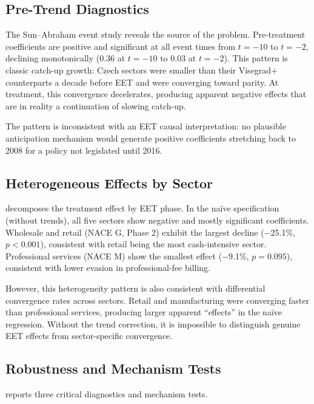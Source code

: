 \documentclass[12pt]{article}
\begin{document}
\subsection{Pre-Trend Diagnostics}

The Sun--Abraham event study reveals the source of the problem. Pre-treatment coefficients are positive and significant at all event times from $t = -10$ to $t = -2$, declining monotonically (0.36 at $t = -10$ to 0.03 at $t = -2$). This pattern is classic catch-up growth: Czech sectors were smaller than their Visegrad+ counterparts a decade before EET and were converging toward parity. At treatment, this convergence decelerates, producing apparent negative effects that are in reality a continuation of slowing catch-up.

The pattern is inconsistent with an EET causal interpretation: no plausible anticipation mechanism would generate positive coefficients stretching back to 2008 for a policy not legislated until 2016.

\subsection{Heterogeneous Effects by Sector}



 decomposes the treatment effect by EET phase. In the na\"{i}ve specification (without trends), all five sectors show negative and mostly significant coefficients. Wholesale and retail (NACE G, Phase 2) exhibit the largest decline ($-$25.1\%, $p < 0.001$), consistent with retail being the most cash-intensive sector. Professional services (NACE M) show the smallest effect ($-$9.1\%, $p = 0.095$), consistent with lower evasion in professional-fee billing.

However, this heterogeneity pattern is also consistent with differential convergence rates across sectors. Retail and manufacturing were converging faster than professional services, producing larger apparent ``effects'' in the na\"{i}ve regression. Without the trend correction, it is impossible to distinguish genuine EET effects from sector-specific convergence.

\subsection{Robustness and Mechanism Tests}



 reports three critical diagnostics and mechanism tests.
\end{document}
